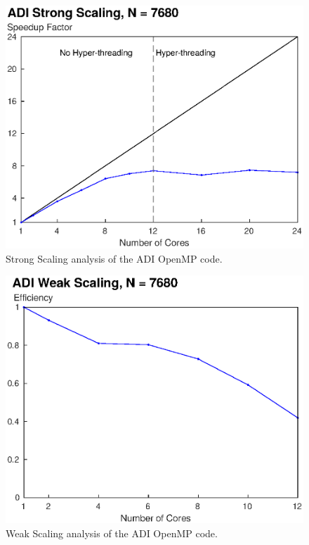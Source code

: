 \documentclass[letterpaper]{article}
\begin{document}
\begin{figure}\centering
  \includegraphics[width=\linewidth]{./plots/scaling_strong_ADI.eps}
  \caption{Strong Scaling analysis of the ADI OpenMP code.}
  \label{fig:scaling_strong_ADI}
\end{figure}

\begin{figure}\centering
  \includegraphics[width=\linewidth]{./plots/scaling_weak_ADI.eps}
  \caption{Weak Scaling analysis of the ADI OpenMP code.}
  \label{fig:scaling_weak_ADI}
\end{figure}
\end{document}
